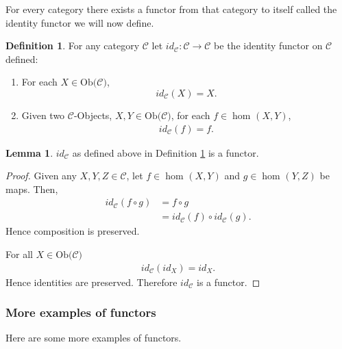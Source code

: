 \documentclass[11pt,a4paper]{article}
\theoremstyle{definition}
\newtheorem{lemma}[thm]{Lemma}
\newtheorem{definition}[thm]{Definition}
\newcommand\ho[3][]{\hom_{#1}(#2,#3)}
\newcommand\ob[1]{\mathrm{Ob(}#1\mathrm{)}}
\newcommand\objs[1]{#1-Objects}
\numberwithin{equation}{section}
\begin{document}
For every category there exists a functor from that category to itself called the identity functor we will now define.
\begin{definition}
\label{def:identityfunctor}
For any category $\mathscr{C}$ let $id_{\mathscr{C}}\colon \mathscr{C}\rightarrow\mathscr{C}$ be the identity functor on $\mathscr{C}$ defined:
\begin{enumerate}
    \item For each $X\in\ob{\mathscr{C}}$,
    \[id_{\mathscr{C}}(X)=X.\]
    \item Given two \objs{$\mathscr{C}$}, $X,Y\in\ob{\mathscr{C}}$, for each $f\in\ho{X}{Y}$,
    \begin{align*}
        id_{\mathscr{C}}(f) = f.
    \end{align*}
\end{enumerate}
\end{definition}
\begin{lemma}
$id_{\mathscr{C}}$ as defined above in Definition \ref{def:identityfunctor} is a functor.
\end{lemma}
\begin{proof}
Given any $X,Y,Z\in\mathscr{C}$, let $f\in\ho{X}{Y}$ and $g\in\ho{Y}{Z}$ be maps. Then,
\begin{align*}
    id_{\mathscr{C}}(f\circ g) &= f\circ g\\
    &= id_{\mathscr{C}}(f)\circ id_{\mathscr{C}}(g).
\end{align*}
Hence composition is preserved.

For all $X\in\ob{\mathscr{C}}$
\begin{align*}
    id_{\mathscr{C}}(id_{X})=id_{X}.
\end{align*}
Hence identities are preserved.
Therefore $id_{\mathscr{C}}$ is a functor.
\end{proof}

\subsubsection{More examples of functors}
\label{ss:otherfunctors}

Here are some more examples of functors.
\end{document}
